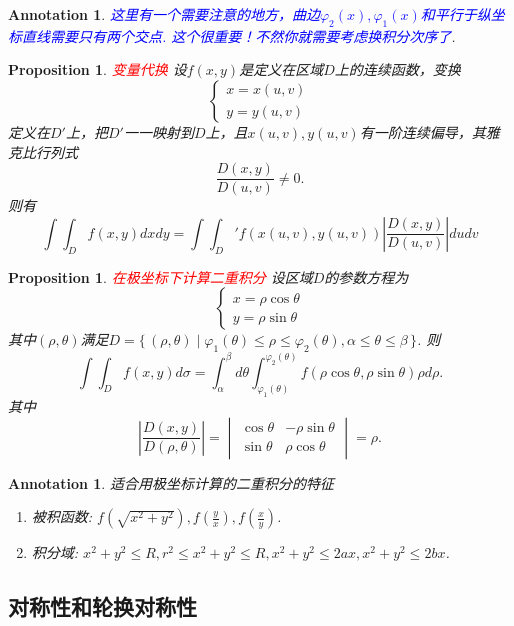 \documentclass{article}
\newtheorem{proposition}[theorem]{Proposition}
\newtheorem{annotation}[theorem]{Annotation}
\newcommand\Set[2]{\{\,#1\mid#2\,\}} %
\newcommand{\redt}[1]{\textcolor{red}{#1}}
\newcommand{\bluet}[1]{\textcolor{blue}{#1}}
\begin{document}
\begin{annotation}
\rm \bluet{这里有一个需要注意的地方，曲边$\varphi_2(x),\varphi_1(x)$和平行于纵坐标直线需要只有两个交点. 这个很重要！不然你就需要考虑换积分次序了}.
\end{annotation}

\begin{proposition}
\rm \redt{变量代换} 设$f(x,y)$是定义在区域$D$上的连续函数，变换
$$
\left \{
\begin{array}{ll}
x = x(u,v)\\
y = y(u,v)
\end{array}
\right.
$$
定义在$D'$上，把$D'$一一映射到$D$上，且$x(u,v),y(u,v)$有一阶连续偏导，其雅克比行列式
$$
\frac{D(x,y)}{D(u,v)} \neq 0.
$$
则有
$$
\int\int_D f(x,y)dxdy = \int\int_D' f(x(u,v),y(u,v))\left| \frac{D(x,y)}{D(u,v)} \right| dudv
$$
\end{proposition}

\begin{proposition}
\rm \redt{在极坐标下计算二重积分} 设区域$D$的参数方程为
$$
\left \{
\begin{array}{ll}
x = \rho \cos \theta \\
y = \rho \sin \theta 
\end{array} \right.
$$
其中$(\rho,\theta)$满足$D = \Set{(\rho,\theta)}{\varphi_1(\theta) \leq \rho \leq \varphi_2(\theta), \alpha \leq \theta \leq \beta}$. 则
$$
\int\int_D f(x,y)d\sigma = \int_\alpha^\beta d\theta \int_{\varphi_1(\theta)}^{\varphi_2(\theta)} f(\rho\cos \theta,\rho\sin\theta)\rho d\rho.
$$
其中
$$
\left|\frac{D(x,y)}{D(\rho,\theta)}\right| = \begin{vmatrix}
\cos\theta &-\rho\sin\theta \\
\sin\theta & \rho\cos\theta 
\end{vmatrix} = \rho.
$$
\end{proposition}

\begin{annotation}
\rm 适合用极坐标计算的二重积分的特征
\begin{enumerate}
	\item 被积函数: $f(\sqrt{x^2+y^2}),f(\frac{y}{x}),f(\frac{x}{y})$.
	\item 积分域: $x^2+y^2 \leq R, r^2 \leq x^2+y^2 \leq R, x^2+y^2 \leq 2ax, x^2+y^2 \leq 2bx$. 
\end{enumerate}
\end{annotation}

\subsection{对称性和轮换对称性}
\end{document}

